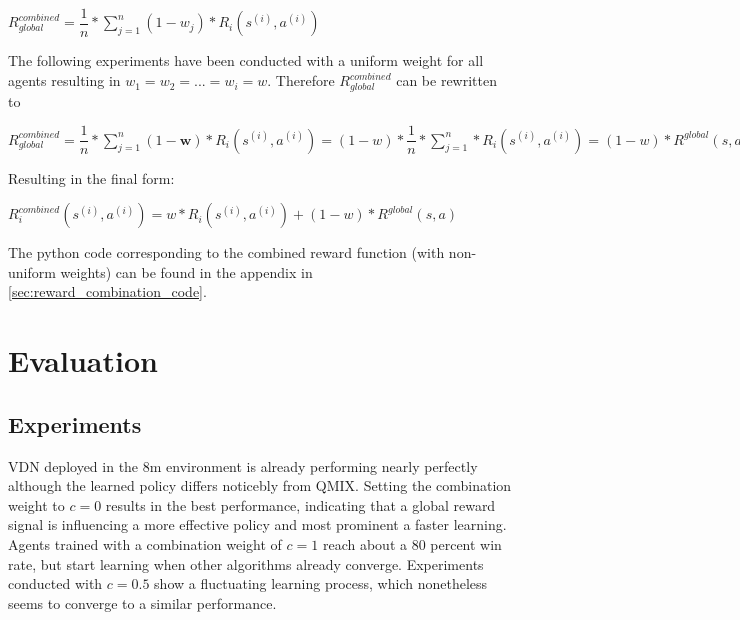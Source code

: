 \begin{center}
	$R_{global}^{combined} = \dfrac{1}{n} * \sum_{j=1}^{n} (1-w_{j}) * R_{i}\left(s^{(i)}, a^{(i)}\right) $
\end{center}

The following experiments have been conducted with a uniform weight for all agents resulting in $w_{1}=w_{2}=...=w_{i}=w$. Therefore $R_{global}^{combined}$ can be rewritten to

\begin{center}
	$R_{global}^{combined} = \dfrac{1}{n} * \sum_{j=1}^{n} (1-\mathbf{w}) * R_{i}\left(s^{(i)}, a^{(i)}\right) = (1-w) * \dfrac{1}{n} * \sum_{j=1}^{n}  * R_{i}\left(s^{(i)}, a^{(i)}\right) = (1-w) * R^{global}(s, a)$
\end{center}

Resulting in the final form:

\begin{center}
	$R_{i}^{combined}\left(s^{(i)}, a^{(i)}\right) = w * R_{i}\left(s^{(i)}, a^{(i)}\right) + (1-w) * R^{global}(s, a) $
\end{center}

The python code corresponding to the combined reward function (with non-uniform weights) can be found in the appendix in \autoref{sec:reward_combination_code}.
\chapter{Evaluation}
\section{Experiments}


VDN deployed in the 8m environment is already performing nearly perfectly although the learned policy differs noticebly from QMIX. Setting the combination weight to $c=0$ results in the best performance, indicating that a global reward signal is influencing a more effective policy and most prominent a faster learning. Agents trained with a combination weight of $c=1$ reach about a 80 percent win rate, but start learning when other algorithms already converge. Experiments conducted with $c=0.5$ show a fluctuating learning process, which nonetheless seems to converge to a similar performance. 

